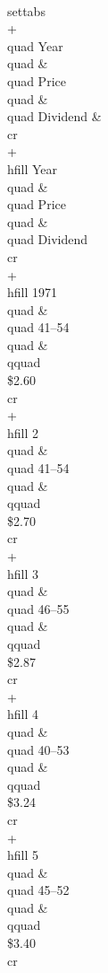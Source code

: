 \beginuser \obeyspaces 
\\settabs \\+ \\quad Year \\quad \& \\quad Price \\quad 
                                            \& \\quad Dividend \& \\cr 
\\+ \\hfill Year \\quad \& \\quad Price  \\quad \& \\quad Dividend \\cr 
\\+ \\hfill 1971 \\quad \& \\quad 41--54 \\quad \& \\qquad \\\$2.60 \\cr 
\\+ \\hfill 2    \\quad \& \\quad 41--54 \\quad \& \\qquad \\\$2.70 \\cr 
\\+ \\hfill 3    \\quad \& \\quad 46--55 \\quad \& \\qquad \\\$2.87 \\cr 
\\+ \\hfill 4    \\quad \& \\quad 40--53 \\quad \& \\qquad \\\$3.24 \\cr 
\\+ \\hfill 5    \\quad \& \\quad 45--52 \\quad \& \\qquad \\\$3.40 \\cr 
\enduser 
 
